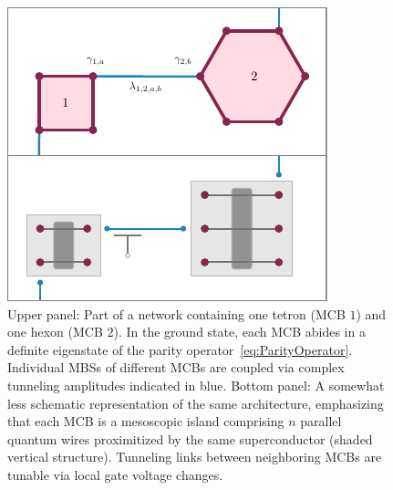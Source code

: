 \documentclass[twocolumn,floats,prx,showpacs]{revtex4-1}
\begin{document}
\begin{figure}[t]
\includegraphics[width=\columnwidth]{fig/MCBHardware.pdf}
\caption{Upper panel: Part of a network containing one tetron (MCB $1$) and one hexon (MCB $2$). In the ground state, each MCB abides in a definite eigenstate of the parity operator~\eqref{eq:ParityOperator}. Individual MBSs of different MCBs are coupled via complex tunneling amplitudes indicated in blue. Bottom panel: A somewhat less schematic representation of the same architecture, emphasizing that each MCB is a mesoscopic island comprising $n$ parallel quantum wires proximitized by the same superconductor (shaded vertical structure). Tunneling links between neighboring MCBs are tunable via local gate voltage changes.} 
\label{fig:MCBHardware}
\end{figure}
\end{document}
